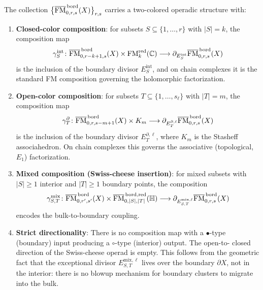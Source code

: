 \begin{theorem}
\label{thm:bordered-operad}
The collection
$\bigl\{\overline{\mathrm{FM}}^{\,\mathrm{bord}}_{0,r,s}(X)
\bigr\}_{r,s}$ carries a two-colored operadic structure with:
\begin{enumerate}[label=(\roman*)]
\item \textbf{Closed-color composition}:
 for subsets $S\subseteq\{1,\dotsc,r\}$ with $|S|=k$, the
 composition map
 \[
 \gamma_S^{\mathrm{int}}\colon
 \overline{\mathrm{FM}}^{\,\mathrm{bord}}_{0,r-k+1,s}(X)
 \times
 \mathrm{FM}_k^{\mathrm{red}}(\mathbb C)
 \longrightarrow
 \partial_{E_S^{\mathrm{int}}}
 \overline{\mathrm{FM}}^{\,\mathrm{bord}}_{0,r,s}(X)
 \]
 is the inclusion of the boundary divisor $E_S^{\mathrm{int}}$,
 and on chain complexes it is the standard FM composition
 governing the holomorphic factorization.

\item \textbf{Open-color composition}:
 for subsets $T\subseteq\{1,\dotsc,s_\ell\}$ with $|T|=m$, the
 composition map
 \[
 \gamma_T^{\partial}\colon
 \overline{\mathrm{FM}}^{\,\mathrm{bord}}_{0,r,s-m+1}(X)
 \times
 K_m
 \longrightarrow
 \partial_{E_T^{\partial,\ell}}
 \overline{\mathrm{FM}}^{\,\mathrm{bord}}_{0,r,s}(X)
 \]
 is the inclusion of the boundary divisor $E_T^{\partial,\ell}$,
 where $K_m$ is the Stasheff associahedron. On chain complexes
 this governs the associative (topological, $E_1$) factorization.

\item \textbf{Mixed composition (Swiss-cheese insertion)}:
 for mixed subsets with $|S|\ge 1$ interior and $|T|\ge 1$
 boundary points, the composition
 \[
 \gamma_{S,T}^{\mathrm{mix}}\colon
 \overline{\mathrm{FM}}^{\,\mathrm{bord}}_{0,r',s'}(X)
 \times
 \overline{\mathrm{FM}}^{\,\mathrm{bord},\mathrm{red}}_{0,|S|,|T|}
 (\mathbb H)
 \longrightarrow
 \partial_{E_{S,T}^{\mathrm{mix},\ell}}
 \overline{\mathrm{FM}}^{\,\mathrm{bord}}_{0,r,s}(X)
 \]
 encodes the bulk-to-boundary coupling.

\item \textbf{Strict directionality}:
 There is no composition map with a $\bullet$-type (boundary)
 input producing a $\circ$-type (interior) output. The open-to-%
 closed direction of the Swiss-cheese operad is empty. This
 follows from the geometric fact that the exceptional divisor
 $E_{S,T}^{\mathrm{mix},\ell}$ lives over the boundary
 $\partial X$, not in the interior: there is no blowup
 mechanism for boundary clusters to migrate into the bulk.
\end{enumerate}
\end{theorem}

